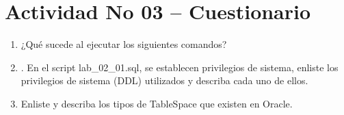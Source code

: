 \section{Actividad No 03 – Cuestionario} 

\begin{enumerate}[1.]
	\item ¿Qué sucede al ejecutar los siguientes comandos?

	\item . En el script lab\_02\_01.sql, se establecen privilegios de sistema, enliste los privilegios de sistema (DDL) utilizados y describa cada uno de ellos.
	
	\item Enliste y describa los tipos de TableSpace que existen en Oracle.
	
	

\end{enumerate} 
